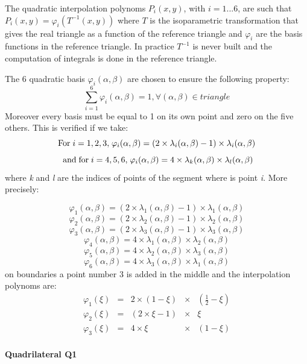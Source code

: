 The quadratic interpolation polynoms $P_{i} (x, y)$, with $i=1...6$, are such
that $P_{i} (x, y)=\varphi _{i} (T^{-1} (x, y))$ where $T$ is the
isoparametric transformation that gives the real triangle as a function of the
reference triangle and $\varphi _{i} $ are the basis functions in the reference
triangle. In practice $T^{-1} $ is never built and the computation of integrals
is done in the reference triangle.

The 6 quadratic basis $\varphi _{i} (\alpha , \beta )$ are chosen to ensure
the following property:
\[\mathop{\sum }\limits_{i=1}^{6} \varphi _{i} (\alpha , \beta )=1, \forall
(\alpha , \beta )\in triangle\]
Moreover every basis must be equal to 1 on its own point and zero on the five
others. This is verified if we take:
\[{\rm For\; }i=1, 2, 3{\rm ,\; }\varphi _{i} (\alpha , \beta )=(2\times
\lambda _{i} (\alpha , \beta )-1)\times \lambda _{i} (\alpha , \beta )\]
\[{\rm \; and\; for\; }i=4, 5, 6{\rm ,\; }\varphi _{i} (\alpha , \beta
)=4\times \lambda _{k} (\alpha , \beta )\times \lambda _{l} (\alpha , \beta
)\]
where \textit{k} and \textit{l} are the indices of points of the segment where
is point \textit{i}. More precisely:


\[\varphi _{1} (\alpha , \beta )=(2\times \lambda _{1} (\alpha , \beta
)-1)\times \lambda _{1} (\alpha , \beta )\]
\[\varphi _{2} (\alpha , \beta )=(2\times \lambda _{2} (\alpha , \beta
)-1)\times \lambda _{2} (\alpha , \beta )\]
\[\varphi _{3} (\alpha , \beta )=(2\times \lambda _{3} (\alpha , \beta
)-1)\times \lambda _{3} (\alpha , \beta )\]
\[\varphi _{4} (\alpha , \beta )=4\times \lambda _{1} (\alpha , \beta
)\times \lambda _{2} (\alpha , \beta )\]
\[\varphi _{5} (\alpha , \beta )=4\times \lambda _{2} (\alpha , \beta
)\times \lambda _{3} (\alpha , \beta )\]
\[\varphi _{6} (\alpha , \beta )=4\times \lambda _{3} (\alpha , \beta
)\times \lambda _{1} (\alpha , \beta )\]
 on boundaries a point number 3 is added in the middle and
the interpolation polynoms are:
\[\begin{array}{lllll}
  {\varphi _{1} (\xi )} & {=} & {2\times (1-\xi )} & {\times } & {({\textstyle\frac{1}{2}} -\xi )} \\
  {\varphi _{2} (\xi )} & {=} & {(2\times \xi -1)} & {\times } & {\xi } \\
  {\varphi _{3} (\xi )} & {=} & {4\times \xi } & {\times } & {(1-\xi )}
\end{array}\]

\paragraph{Quadrilateral Q1}

